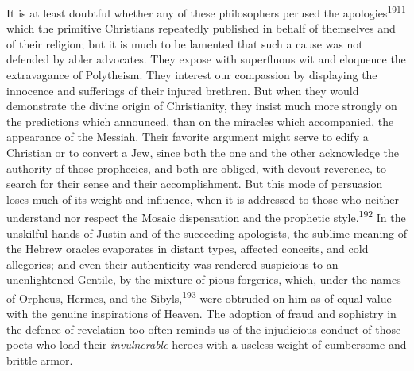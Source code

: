 It is at least doubtful whether any of these philosophers perused
the apologies\textsuperscript{1911} which the primitive Christians repeatedly
published in behalf of themselves and of their religion; but it
is much to be lamented that such a cause was not defended by
abler advocates. They expose with superfluous wit and eloquence
the extravagance of Polytheism. They interest our compassion by
displaying the innocence and sufferings of their injured
brethren. But when they would demonstrate the divine origin of
Christianity, they insist much more strongly on the predictions
which announced, than on the miracles which accompanied, the
appearance of the Messiah. Their favorite argument might serve to
edify a Christian or to convert a Jew, since both the one and the
other acknowledge the authority of those prophecies, and both are
obliged, with devout reverence, to search for their sense and
their accomplishment. But this mode of persuasion loses much of
its weight and influence, when it is addressed to those who
neither understand nor respect the Mosaic dispensation and the
prophetic style.\textsuperscript{192} In the unskilful hands of Justin and of the
succeeding apologists, the sublime meaning of the Hebrew oracles
evaporates in distant types, affected conceits, and cold
allegories; and even their authenticity was rendered suspicious
to an unenlightened Gentile, by the mixture of pious forgeries,
which, under the names of Orpheus, Hermes, and the Sibyls,\textsuperscript{193}
were obtruded on him as of equal value with the genuine
inspirations of Heaven. The adoption of fraud and sophistry in
the defence of revelation too often reminds us of the injudicious
conduct of those poets who load their \textit{invulnerable} heroes with
a useless weight of cumbersome and brittle armor.



